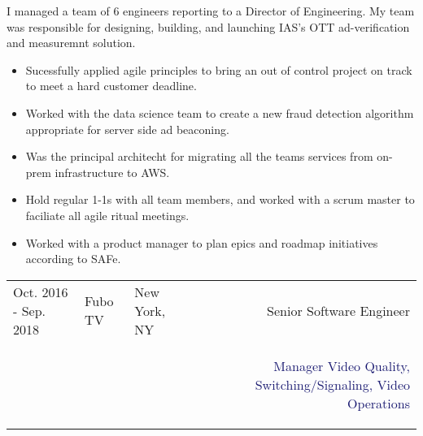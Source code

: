 \documentclass[12t]{article}
\begin{document}
\vspace{3pt} I managed a team of 6 engineers reporting to a Director of Engineering. My team was responsible for designing, building, and
launching IAS's OTT ad-verification and measuremnt solution. 
\begin{multicols}{2}
  \begin{small}
    \begin{itemize}[leftmargin=*,label=\tiny{$\bullet$}]
    \item\begin{minipage}[t]{\linewidth}{Sucessfully applied agile principles to bring an out of control project on track to meet a hard customer deadline.}\end{minipage}
    \item\begin{minipage}[t]{\linewidth}{Worked with the data science team to create a new fraud detection algorithm appropriate for server side ad beaconing.}\end{minipage}
    \item\begin{minipage}[t]{\linewidth}{Was the principal architecht for migrating all the teams services from on-prem infrastructure to AWS.}\end{minipage}
    \item\begin{minipage}[t]{\linewidth}{Hold regular 1-1s with all team members, and worked with a scrum master to faciliate all agile ritual meetings.}\end{minipage}
    \item\begin{minipage}[t]{\linewidth}{Worked with a product manager to plan epics and roadmap initiatives according to SAFe.}\end{minipage}
    \end{itemize}
  \end{small} 
\end{multicols}

\pagebreak 
\begin{tabularx}{\textwidth}{@{}lllXr}
  Oct. 2016 - Sep. 2018&\textcolor{Mahogany}{Fubo TV}&\textcolor{Black!80}{New York, NY}&&\textcolor{MidnightBlue!75}{Senior Software Engineer}\\
  &&&&\textcolor{MidnightBlue}{\begin{minipage}[t]{2in}{Manager Video Quality, Switching/Signaling, Video Operations}\end{minipage}}\\
\end{tabularx}
\end{document}
